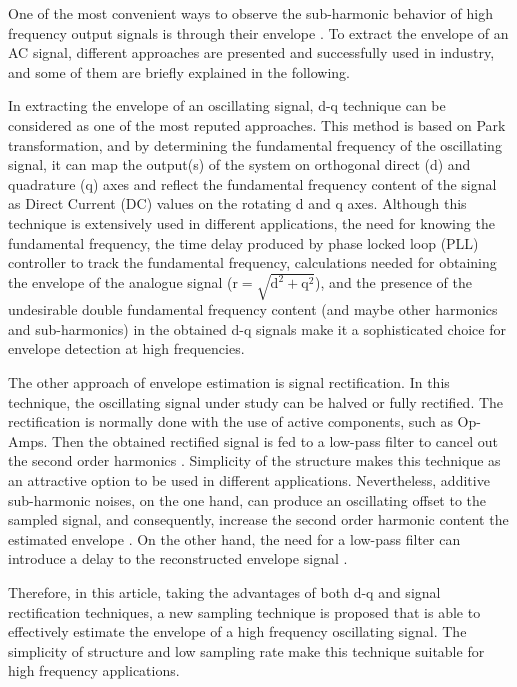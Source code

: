 \documentclass[journal,a4paper,10pt,twoside]{IEEEtran} %
\begin{document}
	One of the most convenient ways to observe the sub-harmonic behavior of high frequency output signals is through their envelope \cite{ENVELOPE_1,ENVELOPE_2,ENVELOPE_3,ENVELOPE_4,ENVELOPE_5}. To extract the envelope of an AC signal, different approaches are presented and successfully used in industry, and some of them are briefly explained in the following.
	
	In extracting the envelope of an oscillating signal, {d-q} technique can be considered as one of the most reputed approaches. This method is based on Park transformation, and by determining the fundamental frequency of the oscillating signal, it can map the output(s) of the system on orthogonal direct (d) and quadrature (q) axes \cite{DQ_1,DQ_2,DQ_3} and reflect the fundamental frequency content of the signal as Direct Current (DC) values on the rotating {d} and {q} axes. 
	Although this technique is extensively used in different applications, the need for knowing the fundamental frequency, the time delay produced by phase locked loop (PLL) controller to track the fundamental frequency, calculations needed for obtaining the envelope of the analogue signal (${\mathrm{r=\sqrt{d^2+q^2}}}$), and the presence of the undesirable double fundamental frequency content (and maybe other harmonics and sub-harmonics) in the obtained {d-q} signals make it a sophisticated choice for envelope detection at high frequencies.
	
	The other approach of envelope estimation is signal rectification. In this technique, the oscillating signal under study can be halved or fully rectified. The rectification is normally done with the use of active components, such as Op-Amps. Then the obtained rectified signal is fed to a low-pass filter to cancel out the second order harmonics \cite{REC_1,REC_2,REC_3,REC_4}. Simplicity of the structure makes this technique as an attractive option to be used in different applications.
	Nevertheless, additive sub-harmonic noises, on the one hand, can produce an oscillating offset to the sampled signal, and consequently, increase the second order harmonic content the estimated envelope \cite{REC_4, REC_5}. On the other hand, the need for a low-pass filter can introduce a delay to the reconstructed envelope signal \cite{REC_1}.
	
	Therefore, in this article, taking the advantages of both {d-q} and signal rectification techniques, a new sampling technique is proposed that is able to effectively estimate the envelope of a high frequency oscillating signal. The simplicity of structure and low sampling rate make this technique suitable for high frequency applications. %
	
\end{document}
